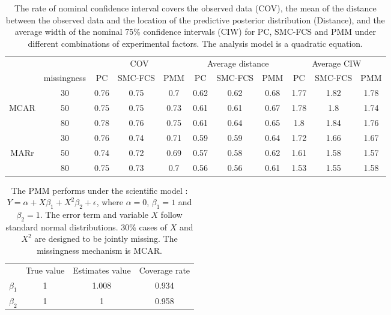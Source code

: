 	\begin{table}
		\begin{tabular}{cc|ccc|ccc|ccc}
			\multicolumn{2}{l}{}                    & \multicolumn{3}{c|}{COV} & \multicolumn{3}{c|}{Average distance} & \multicolumn{3}{c}{Average CIW} \\ \cline{2-11} 
			\multicolumn{1}{c|}{}     & missingness & PC    & SMC-FCS  & PMM   & PC         & SMC-FCS      & PMM       & PC       & SMC-FCS    & PMM     \\
			\multicolumn{1}{c|}{}     & 30          & 0.76  & 0.75     & 0.7   & 0.62       & 0.62         & 0.68      & 1.77     & 1.82       & 1.78    \\
			\multicolumn{1}{c|}{MCAR} & 50          & 0.75  & 0.75     & 0.73  & 0.61       & 0.61         & 0.67      & 1.78     & 1.8        & 1.74    \\
			\multicolumn{1}{c|}{}     & 80          & 0.78  & 0.76     & 0.75  & 0.61       & 0.64         & 0.65      & 1.8      & 1.84       & 1.76    \\ \hline
			\multicolumn{1}{c|}{}     & 30          & 0.76  & 0.74     & 0.71  & 0.59       & 0.59         & 0.64      & 1.72     & 1.66       & 1.67    \\
			\multicolumn{1}{c|}{MARr} & 50          & 0.74  & 0.72     & 0.69  & 0.57       & 0.58         & 0.62      & 1.61     & 1.58       & 1.57    \\
			\multicolumn{1}{c|}{}     & 80          & 0.75  & 0.73     & 0.7   & 0.56       & 0.56         & 0.61      & 1.53     & 1.55       & 1.58   
		\end{tabular}
		\caption{The rate of nominal confidence interval covers the observed data (COV), the mean of the distance between the observed data and the location of the predictive posterior distribution (Distance), and the average width of the nominal 75\% confidence intervals (CIW) for PC, SMC-FCS and PMM under different combinations of experimental factors. The analysis model is a quadratic equation.}
		\label{tab6_3}
	\end{table}
	
	\begin{table}[ht!]
		\begin{tabular}{cccc}
			& True value & Estimates value & Coverage rate \\
			$\beta_1$ & 1          & 1.008           & 0.934         \\
			$\beta_2$ & 1          & 1               & 0.958        
		\end{tabular}
		\caption{The PMM performs under the scientific model : $Y = \alpha + X\beta_{1} + X^2\beta_{2} +\epsilon$, where $\alpha = 0$, $\beta_{1} = 1$ and $\beta_{2} = 1$. The error term and variable $X$ follow standard normal distributions. 30\% cases of $X$ and $X^2$ are designed to be jointly missing. The missingness mechanism is MCAR.}
		\label{tab6_4}
	\end{table}
	
